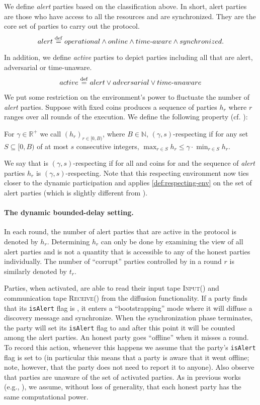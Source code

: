 We define \emph{alert} parties based on the classification above.
%
In short, alert parties are those who have access to all the resources and are synchronized. They are the core set of parties to carry out the protocol.
%
\[
    alert \overset{\mathrm{def}}{=} operational \wedge online \wedge time\text{-}aware \wedge synchronized.
\]

In addition, we define \emph{active} parties to depict parties including all that are alert, adversarial or time-unaware.
%
\[
    active \overset{\mathrm{def}}{=} alert \vee adversarial \vee time\text{-}unaware
\]

We put some restriction on the environment's power to fluctuate the number of \emph{alert} parties.
%
Suppose \Z with fixed coins produces a sequence of parties $h_r$ where $r$ ranges over all rounds of the execution. We define the following property (cf. \cite{EPRINT:GarKiaLeo20}):
%
\begin{definition} \label{def:respecting-env}
    For $\gamma \in \mathbb{R}^+$ we call $(h_r)_{r \in [0, B)}$, where $B \in \mathbb{N}$, $(\gamma, s)$-respecting if for any set $S \subseteq [0, B)$ of at most $s$ consecutive integers, $\max_{r \in S} h_r \le \gamma \cdot \min_{r \in S} h_r$.
\end{definition}

We say that \Z is $(\gamma, s)$-respecting if for all \adv and coins for \Z and \adv the sequence of \emph{alert} parties $h_r$ is $(\gamma, s)$-respecting.
%
Note that this respecting environment now ties closer to the dynamic participation and applies \cref{def:respecting-env} on the set of alert parties (which is slightly different from \cite{C:GarKiaLeo17,EPRINT:GarKiaLeo20}).

\paragraph{The dynamic bounded-delay setting.}
%
In each round, the number of alert parties that are active in the protocol is denoted by $h_r$.
%
Determining $h_r$ can only be done by examining the view of all alert parties and is not a quantity that is accessible to any of the honest parties individually.
%
The number of ``corrupt'' parties controlled by \adv in a round $r$ is similarly denoted by $t_r$.

Parties, when activated, are able to read their input tape \textsc{Input()} and communication tape \textsc{Receive()} from the diffusion functionality.
%
If a party finds that its \texttt{isAlert} flag is \false, it enters a ``bootstrapping'' mode where it will diffuse a discovery message and synchronize.
%
When the synchronization phase terminates, the party will set its \texttt{isAlert} flag to \true and after this point it will be counted among the alert parties.
%
An honest party goes ``offline'' when it misses a round.
%
To record this action, whenever this happens we assume that the party's \texttt{isAlert} flag is set to \false (in particular this means that a party is aware that it went offline; note, however, that the party does not need to report it to anyone).
%
Also observe that parties are unaware of the set of activated parties.
%
As in previous works (e.g., \cite{EC:GarKiaLeo15}), we assume, without loss of generality, that each honest party has the same computational power.

